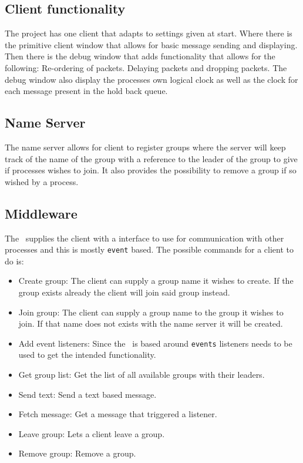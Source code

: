 \subsection{Client functionality}
The project has one client that adapts to settings given at start. Where there is the primitive client window that allows for basic message sending and displaying. Then there is the debug window that adds functionality that allows for the following: Re-ordering of packets. Delaying packets and dropping packets. The debug window also display the processes own logical clock as well as the clock for each message present in the hold back queue.

\subsection{Name Server}
The name server allows for client to register groups where the server will keep track of the name of the group with a reference to the leader of the group to give if processes wishes to join. It also provides the possibility to remove a group if so wished by a process. 

\subsection{Middleware}
The \mw\ supplies the client with a interface to use for communication with other processes and this is mostly \texttt{event} based. The possible commands for a client to do is:

\begin{itemize}
	\item Create group: The client can supply a group name it wishes to create. If the group exists already the client will join said group instead.
	\item Join group: The client can supply a group name to the group it wishes to join. If that name does not exists with the name server it will be created.
	\item Add event listeners: Since the \mw\ is based around \texttt{events} listeners needs to be used to get the intended functionality.
	\item Get group list: Get the list of all available groups with their leaders.
	\item Send text: Send a text based message.
	\item Fetch message: Get a message that triggered a listener.
	\item Leave group: Lets a client leave a group.
	\item Remove group: Remove a group.
\end{itemize}

